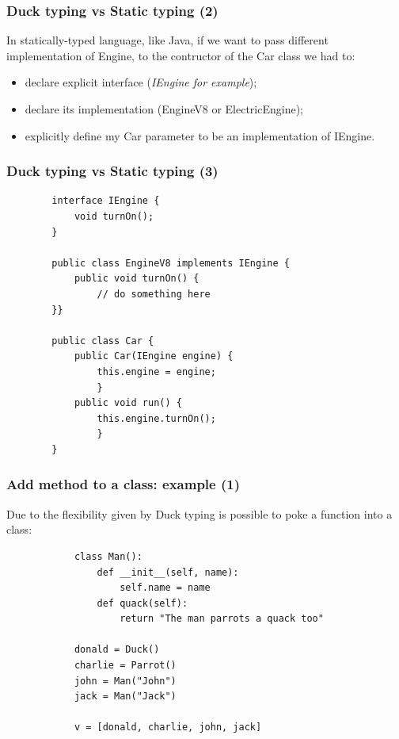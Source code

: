 \documentclass[xcolor ={table,usenames,dvipsnames}]{beamer}
\theoremstyle{definition}
\begin{document}
	\begin{frame}
		\frametitle{Duck typing vs Static typing (2)}
		In statically-typed language, like Java, if we want to pass different implementation of Engine, to the contructor of the Car class we had to:
		\begin{itemize}
			\item declare explicit interface (\textit{IEngine for example});
			\item declare its implementation (EngineV8 or ElectricEngine);
			\item explicitly define my Car parameter to be an implementation of IEngine.
		\end{itemize} 
		
	\end{frame}
	
	\begin{frame}[fragile]
		\frametitle{Duck typing vs Static typing (3)}	
		\begin{lstlisting}
		interface IEngine {
			void turnOn();
		}
		
		public class EngineV8 implements IEngine {
			public void turnOn() {
				// do something here
		}}
		
		public class Car {
			public Car(IEngine engine) {
				this.engine = engine;
				}
			public void run() {
				this.engine.turnOn();
				}
		}
		\end{lstlisting}
	\end{frame}

		
		
		
	
	\begin{frame}[fragile]
		\frametitle{Add method to a class: example (1)}
		Due to the flexibility given by Duck typing is possible to poke a function into a class:
		\begin{lstlisting}	
			class Man():
				def __init__(self, name):
					self.name = name
				def quack(self):
					return "The man parrots a quack too"
			
			donald = Duck()
			charlie = Parrot()
			john = Man("John")
			jack = Man("Jack")
			
			v = [donald, charlie, john, jack]
					
			
		\end{lstlisting}
	\end{frame}
	
\end{document}
